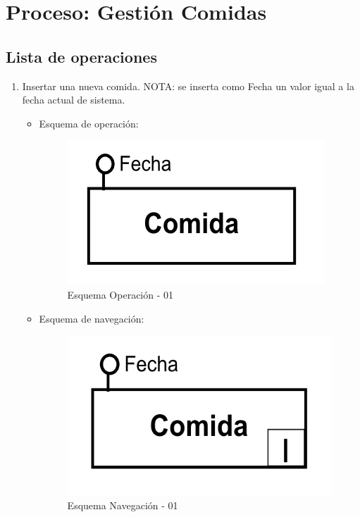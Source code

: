 \documentclass[a4paper,12pt]{report}
\begin{document}
\section{Proceso: Gestión Comidas}
\label{sec-7-7}
\subsection{Lista de operaciones}
\label{sec-7-7-1}
\begin{enumerate}
\item Insertar una nueva comida.
NOTA: se inserta como Fecha un valor igual a la fecha actual de sistema.
\begin{itemize}
\item Esquema de operación:
\begin{figure}[!htp]
\centering
\includegraphics[width=0.9\linewidth]{./operaciones/img/Comidas/01_ope.png}
\caption{Esquema Operación - 01}
\label{fig:ope01}
\medskip
\footnotesize
{}
\end{figure}
\item Esquema de navegación:
\begin{figure}[!htp]
\centering
\includegraphics[width=0.9\linewidth]{./operaciones/img/Comidas/01_nav.png}
\caption{Esquema Navegación - 01}
\label{fig:nave01}
\medskip
\footnotesize
{}
\end{figure}
\end{itemize}


\end{enumerate}
\end{document}

